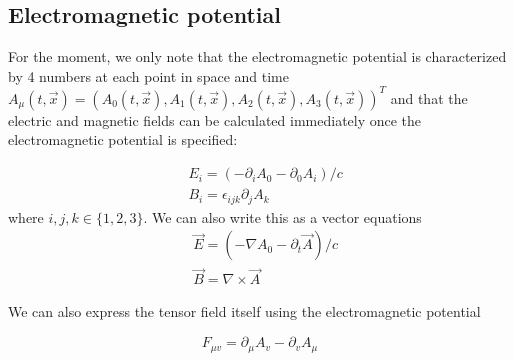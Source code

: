 \subsection{Electromagnetic potential}
For the moment, we only note that the electromagnetic potential is characterized by 4 numbers at each point in space and time $A_{\mu}(t, \vec{x})=\left(A_{0}(t, \vec{x}), A_{1}(t, \vec{x}), A_{2}(t, \vec{x}), A_{3}(t, \vec{x})\right)^{T}$ and that the electric and magnetic fields can be calculated immediately once the electromagnetic potential is specified:
\begin{qt}
    \begin{equation}
\begin{aligned}
&E_{i}=\left(-\partial_{i} A_{0}-\partial_{0} A_{i}\right) / c\\
&B_{i}=\epsilon_{i j k} \partial_{j} A_{k}
\end{aligned}
\end{equation}
where $i, j, k \in\{1,2,3\} .$ We can also write this as a vector equations
\begin{equation}
\begin{aligned}
&\vec{E}=\left(-\nabla A_{0}-\partial_{t} \vec{A}\right) / c\\
&\vec{B}=\nabla \times \vec{A}
\end{aligned}
\end{equation}
\end{qt}
We can also express the tensor field itself using the electromagnetic potential
\begin{qt}
    \begin{equation}
F_{\mu v}=\partial_{\mu} A_{v}-\partial_{v} A_{\mu}
\end{equation}
\end{qt}


